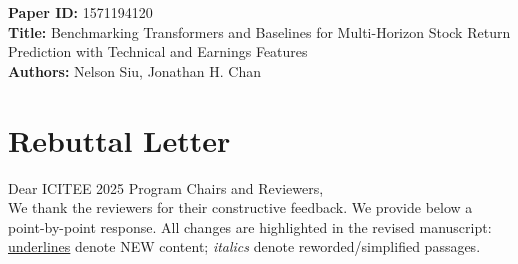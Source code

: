 \documentclass[11pt]{article}
\begin{document}
\noindent \textbf{Paper ID:} 1571194120\\
\textbf{Title:} Benchmarking Transformers and Baselines for Multi-Horizon Stock Return Prediction with Technical and Earnings Features\\
\textbf{Authors:} Nelson Siu, Jonathan H. Chan 

\section*{Rebuttal Letter}
Dear ICITEE 2025 Program Chairs and Reviewers,\\
We thank the reviewers for their constructive feedback. We provide below a point-by-point response. All changes are highlighted in the revised manuscript: \underline{underlines} denote NEW content; \emph{italics} denote reworded/simplified passages.
\end{document}

